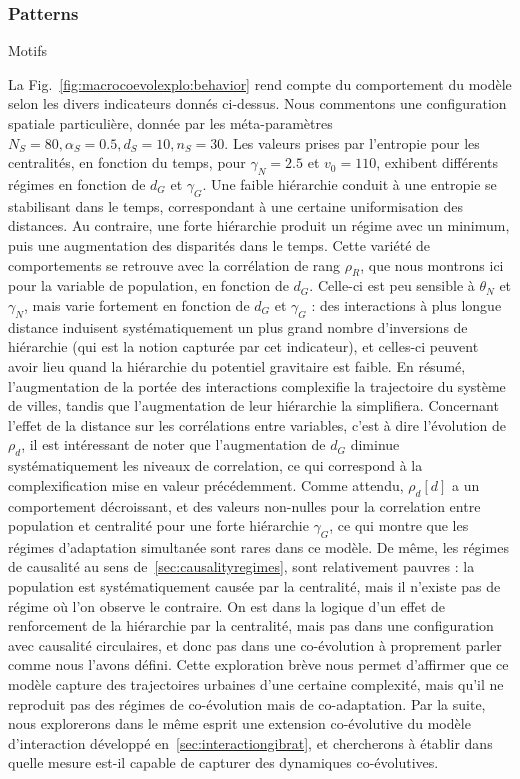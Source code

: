 \subsubsection{Patterns}{Motifs}


La Fig.~\ref{fig:macrocoevolexplo:behavior} rend compte du comportement du modèle selon les divers indicateurs donnés ci-dessus. Nous commentons une configuration spatiale particulière, donnée par les méta-paramètres $N_S=80,\alpha_S=0.5,d_S=10,n_S=30$. Les valeurs prises par l'entropie pour les centralités, en fonction du temps, pour $\gamma_N = 2.5$ et $v_0 = 110$, exhibent différents régimes en fonction de $d_G$ et $\gamma_G$. Une faible hiérarchie conduit à une entropie se stabilisant dans le temps, correspondant à une certaine uniformisation des distances. Au contraire, une forte hiérarchie produit un régime avec un minimum, puis une augmentation des disparités dans le temps. Cette variété de comportements se retrouve avec la corrélation de rang $\rho_R$, que nous montrons ici pour la variable de population, en fonction de $d_G$. Celle-ci est peu sensible à $\theta_N$ et $\gamma_N$, mais varie fortement en fonction de $d_G$ et $\gamma_G$ : des interactions à plus longue distance induisent systématiquement un plus grand nombre d'inversions de hiérarchie (qui est la notion capturée par cet indicateur), et celles-ci peuvent avoir lieu quand la hiérarchie du potentiel gravitaire est faible. En résumé, l'augmentation de la portée des interactions complexifie la trajectoire du système de villes, tandis que l'augmentation de leur hiérarchie la simplifiera. Concernant l'effet de la distance sur les corrélations entre variables, c'est à dire l'évolution de $\rho_d$, il est intéressant de noter que l'augmentation de $d_G$ diminue systématiquement les niveaux de correlation, ce qui correspond à la complexification mise en valeur précédemment. Comme attendu, $\rho_d\left[d\right]$ a un comportement décroissant, et des valeurs non-nulles pour la correlation entre population et centralité pour une forte hiérarchie $\gamma_G$, ce qui montre que les régimes d'adaptation simultanée sont rares dans ce modèle. De même, les régimes de causalité au sens de~\ref{sec:causalityregimes}, sont relativement pauvres : la population est systématiquement causée par la centralité, mais il n'existe pas de régime où l'on observe le contraire. On est dans la logique d'un effet de renforcement de la hiérarchie par la centralité, mais pas dans une configuration avec causalité circulaires, et donc pas dans une co-évolution à proprement parler comme nous l'avons défini. Cette exploration brève nous permet d'affirmer que ce modèle capture des trajectoires urbaines d'une certaine complexité, mais qu'il ne reproduit pas des régimes de co-évolution mais de co-adaptation. Par la suite, nous explorerons dans le même esprit une extension co-évolutive du modèle d'interaction développé en~\ref{sec:interactiongibrat}, et chercherons à établir dans quelle mesure est-il capable de capturer des dynamiques co-évolutives.




